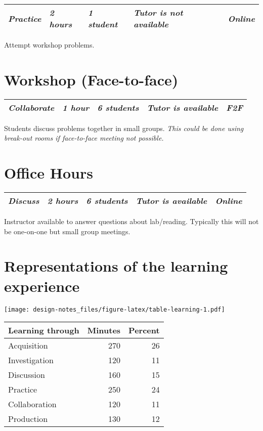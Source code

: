 \documentclass[
]{book}
\begin{document}
\begin{longtable}[]{@{}lllll@{}}
\toprule
\endhead
\emph{Practice} & \emph{2 hours} & \emph{1 student} & \emph{Tutor is not available} & \emph{Online}\tabularnewline
\bottomrule
\end{longtable}

Attempt workshop problems.

\hypertarget{workshop-face-to-face}{%
\section{Workshop (Face-to-face)}\label{workshop-face-to-face}}

\begin{longtable}[]{@{}lllll@{}}
\toprule
\endhead
\emph{Collaborate} & \emph{1 hour} & \emph{6 students} & \emph{Tutor is available} & \emph{F2F}\tabularnewline
\bottomrule
\end{longtable}

Students discuss problems together in small groups. \emph{This could be done
using break-out rooms if face-to-face meeting not possible.}

\hypertarget{office-hours}{%
\section{Office Hours}\label{office-hours}}

\begin{longtable}[]{@{}lllll@{}}
\toprule
\endhead
\emph{Discuss} & \emph{2 hours} & \emph{6 students} & \emph{Tutor is available} & \emph{Online}\tabularnewline
\bottomrule
\end{longtable}

Instructor available to answer questions about lab/reading. Typically
this will not be one-on-one but small group meetings.

\hypertarget{representations-of-the-learning-experience}{%
\section*{Representations of the learning experience}\label{representations-of-the-learning-experience}}

\texttt{[image: design-notes\_files/figure-latex/table-learning-1.pdf]}

\begin{tabular}{l|r|r}
\hline
Learning through & Minutes & Percent\\
\hline
Acquisition & 270 & 26\\
\hline
Investigation & 120 & 11\\
\hline
Discussion & 160 & 15\\
\hline
Practice & 250 & 24\\
\hline
Collaboration & 120 & 11\\
\hline
Production & 130 & 12\\
\hline
\end{tabular}
\end{document}

